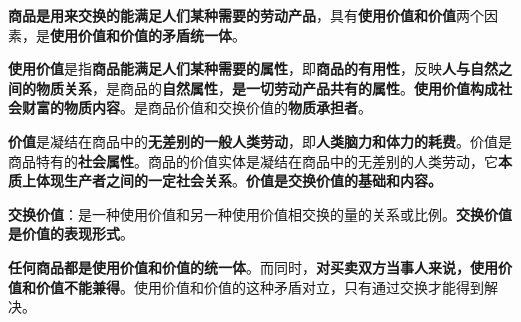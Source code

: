 \textbf{{商品是用来交换的能满足人们某种需要的劳动产品}}，具有\textbf{{使用价值和价值}}两个因素，是\textbf{{使用价值和价值的矛盾统一体}}。

\textbf{{使用价值}}{是指}\textbf{{商品能满足人们某种需要的属性}}{，即}\textbf{{商品的有用性}}{，反映}\textbf{{人与自然之间的物质关系}}{，是商品的}\textbf{{自然属性}}{，}\textbf{{是一切劳动产品共有的属性}}{。}\textbf{{使用价值构成社会财富的物质内容}}{。是商品价值和交换价值的}\textbf{{物质承担者}}{。}

\textbf{{价值}}是凝结在商品中的\textbf{{无差别的一般人类劳动}}，即\textbf{{人类脑力和体力的耗费}}。价值是商品特有的\textbf{{社会属性}}。商品的价值实体是凝结在商品中的无差别的人类劳动，它\textbf{{本质上体现生产者之间的一定社会关系}}。\textbf{{价值是交换价值的基础和内容。}}

\textbf{{交换价值}}{：是一种使用价值和另一种使用价值相交换的量的关系或比例。}\textbf{{交换价值是价值的表现形式}}{。}

\textbf{{任何商品都是使用价值和价值的统一体}}{。而同时，}\textbf{{对买卖双方当事人来说，使用价值和价值不能兼得}}{。}{使用价值和价值的这种矛盾对立，只有通过交换才能得到解决}{。}
